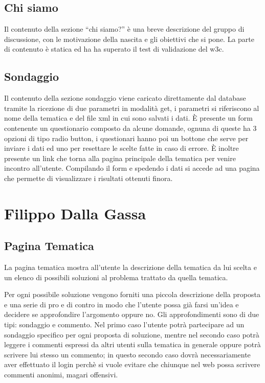 \documentclass[a4paper,10pt]{article}
\begin{document}
\subsection{Chi siamo}

Il contenuto della sezione ``chi siamo?'' \`e una breve descrizione del gruppo di discussione, con le motivazione della nascita e gli obiettivi che si pone. La parte di contenuto \`e statica ed ha ha superato il test di validazione del w3c.

\subsection{Sondaggio}
 
Il contenuto della sezione sondaggio viene caricato direttamente dal database tramite la ricezione di due parametri in modalit\`a get, i parametri si riferiscono al nome della tematica e del file xml in cui sono salvati i dati. \`E presente un form contenente un questionario composto da alcune domande, ognuna di queste ha 3 opzioni di tipo radio button, i questionari hanno poi un bottone che serve per inviare i dati ed uno per resettare le scelte fatte in caso di errore. \`E inoltre presente un link che torna alla pagina principale della tematica per venire incontro all'utente. Compilando il form e spedendo i dati si accede ad una pagina che permette di visualizzare i risultati ottenuti finora.

\section{Filippo Dalla Gassa}

\subsection{Pagina Tematica}

La pagina tematica mostra all'utente la descrizione della tematica da lui scelta e un elenco di possibili soluzioni al problema trattato da quella tematica.

Per ogni possibile soluzione vengono forniti una piccola descrizione della proposta e una serie di pro e di contro in modo che l'utente possa gi\`a farsi un'idea e decidere se approfondire l'argomento oppure no. Gli approfondimenti sono di due tipi: sondaggio e commento. Nel primo caso l'utente potr\`a partecipare ad un sondaggio specifico per ogni proposta di soluzione, mentre nel secondo caso potr\`a leggere i commenti espressi da altri utenti sulla tematica in generale oppure potr\`a scrivere lui stesso un commento; in questo secondo caso dovr\`a necessariamente aver effettuato il login perch\`e si vuole evitare che chiunque nel web possa scrivere commenti anonimi, magari offensivi.
\end{document}
